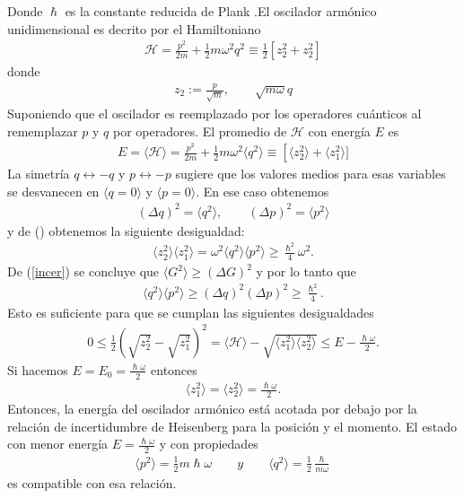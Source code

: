 \documentclass[letterpaper,12pt,oneside]{book}
\begin{document}
%
Donde $\hslash$ es la constante reducida de Plank .El oscilador arm\'onico unidimensional es decrito por el Hamiltoniano 
%
\begin{eqnarray}
\mathcal{H}= \frac{p^2}{2m} +\frac{1}{2}m\omega^2q^2 \equiv \frac{1}{2}\left[z^2_2+z^2_2\right] 
\end{eqnarray}
%
donde
%
\begin{eqnarray}
z_2 := \frac{p}{\sqrt{m}}, \qquad \sqrt{m\omega}q
\end{eqnarray}
%
Suponiendo que el oscilador es reemplazado por los operadores cu\'anticos al rememplazar $p$ y $q$ por operadores. El promedio de $\mathcal{H}$ con energ\'ia $E$ es
%
\begin{eqnarray}
E = \langle \mathcal{H} \rangle = \frac{p^2}{2m} + \frac{1}{2}m\omega^2\langle q^2 \rangle \equiv \left[\langle z^2_2 \rangle + \langle z^2_1 \rangle] \right.
\end{eqnarray}
%
La simetr\'ia $q \leftrightarrow -q$ y $p \leftrightarrow -p$ sugiere que los valores medios para esas variables se desvanecen en $\langle q=0 \rangle$ y $\langle p=0 \rangle$. En ese caso obtenemos
%
\begin{eqnarray}
(\Delta q)^2 = \langle q^2 \rangle, \qquad (\Delta p)^2 = \langle p^2 \rangle
\end{eqnarray}
%
y de (\cite{heise}) obtenemos la siguiente desigualdad:
%
\begin{eqnarray}
\langle z_2^2 \rangle \langle z_1^2 \rangle = \omega^2 \langle q^2 \rangle \langle p^2 \rangle \geq  \frac{\hslash^2}{4}\omega^2.
\end{eqnarray}
%
De (\ref{incer}) se concluye que $\langle G^2 \rangle \geq ( \Delta G)^2$ y por lo tanto que
%
\begin{eqnarray}
\langle q^2 \rangle\langle p^2 \rangle \geq (\Delta q)^2(\Delta p)^2 \geq \frac{\hslash^2}{4}.
\end{eqnarray}
%
Esto es suficiente para que se cumplan las siguientes desigualdades
%
\begin{eqnarray}
0\leq\frac{1}{2}\left (\sqrt{z_2^2}-\sqrt{z_1^2}\right)^2 = \langle \mathcal{H} \rangle - \sqrt{ \langle z_1^2 \rangle \langle z_2^2 \rangle} \leq E - \frac{\hslash \omega }{2}.
\end{eqnarray}
%
Si hacemos $E=E_0=\frac{\hslash \omega }{2}$ entonces 
%
\begin{eqnarray}
\langle z_1^2 \rangle = \langle z_2^2 \rangle = \frac{\hslash\omega}{2}.
\end{eqnarray}
%
Entonces, la energ\'ia del oscilador arm\'onico est\'a acotada por debajo por la relaci\'on de incertidumbre de Heisenberg para la posici\'on y el momento. El estado con menor energ\'ia $E=\frac{\hslash\omega}{2}$ y con propiedades
%
\begin{eqnarray}
\langle p^2 \rangle = \frac{1}{2}m\hslash\omega \qquad y \qquad \langle q^2 \rangle = \frac{1}{2}\frac{\hslash}{m\omega}  
\end{eqnarray}
%
es compatible con esa relaci\'on.
\end{document}
